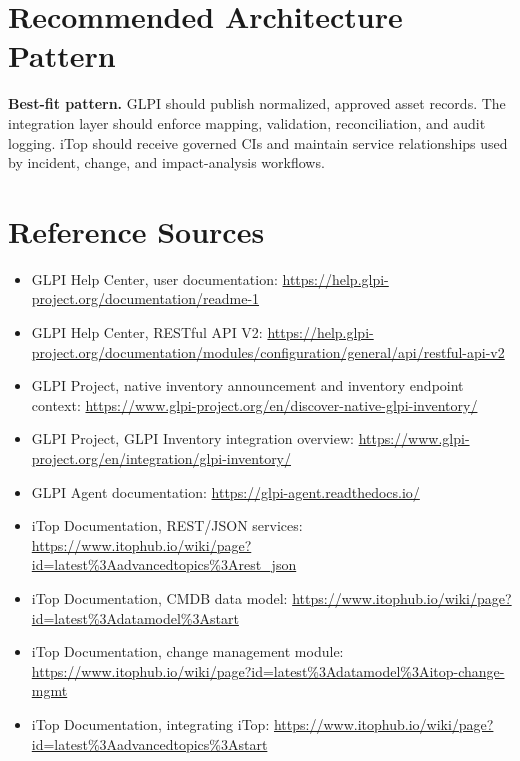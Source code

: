 \documentclass[11pt]{article}
\newcommand{\sourcesection}{%
\section*{Reference Sources}
\small
\begin{itemize}
  \item GLPI Help Center, user documentation: \url{https://help.glpi-project.org/documentation/readme-1}
  \item GLPI Help Center, RESTful API V2: \url{https://help.glpi-project.org/documentation/modules/configuration/general/api/restful-api-v2}
  \item GLPI Project, native inventory announcement and inventory endpoint context: \url{https://www.glpi-project.org/en/discover-native-glpi-inventory/}
  \item GLPI Project, GLPI Inventory integration overview: \url{https://www.glpi-project.org/en/integration/glpi-inventory/}
  \item GLPI Agent documentation: \url{https://glpi-agent.readthedocs.io/}
  \item iTop Documentation, REST/JSON services: \url{https://www.itophub.io/wiki/page?id=latest\%3Aadvancedtopics\%3Arest_json}
  \item iTop Documentation, CMDB data model: \url{https://www.itophub.io/wiki/page?id=latest\%3Adatamodel\%3Astart}
  \item iTop Documentation, change management module: \url{https://www.itophub.io/wiki/page?id=latest\%3Adatamodel\%3Aitop-change-mgmt}
  \item iTop Documentation, integrating iTop: \url{https://www.itophub.io/wiki/page?id=latest\%3Aadvancedtopics\%3Astart}
\end{itemize}
\normalsize
}
\begin{document}
\section{Recommended Architecture Pattern}

\begin{calloutbox}
\textbf{Best-fit pattern.} GLPI should publish normalized, approved asset records. The integration layer should enforce mapping, validation, reconciliation, and audit logging. iTop should receive governed CIs and maintain service relationships used by incident, change, and impact-analysis workflows.
\end{calloutbox}

\sourcesection
\end{document}
